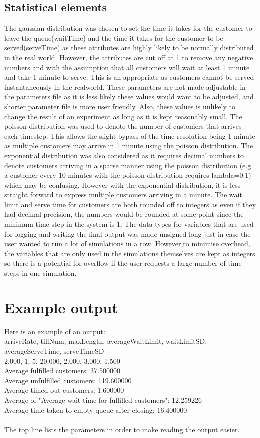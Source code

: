 \documentclass{article}
\begin{document}
\subsection{Statistical elements}
The gaussian distribution was chosen to set the time it takes for the customer to leave the queue(waitTime) and the time it takes for the customer to be served(serveTime) as these attributes are highly likely to be normally distributed in the real world. However, the attributes are cut off at 1 to remove any negative numbers and with the assumption that all customers will wait at least 1 minute and take 1 minute to serve. This is an appropriate as customers cannot be served instantaneously in the realworld. These parameters are not made adjustable in the parameters file as it is less likely these values would want to be adjusted, and shorter parameter file is more user friendly. Also, these values is unlikely to change the result of an experiment as long as it is kept reasonably small.
The poisson distribution was used to denote the number of customers that arrives each timestep. This allows the slight bypass of the time resolution being 1 minute as multiple customers may arrive in 1 minute using the poisson distribution. The exponential distribution was also considered as it requires decimal numbers to denote customers arriving in a sparse manner using the poisson distribution (e.g. a customer every 10 minutes with the poisson distribution requires lambda=0.1) which may be confusing. However with the exponential distribution, it is less straight forward to express multiple customers arriving in a minute.
The wait limit and serve time for customers are both rounded off to integers as even if they had decimal precision, the numbers would be rounded at some point since the minimum time step in the system is 1.
The data types for variables that are used for logging and writing the final output was made unsigned long just in case the user wanted to run a lot of simulations in a row. However,to minimise overhead, the variables that are only used in the simulations themselves are kept as integers so there is a potential for overflow if the user requests a large number of time steps in one simulation.

\section{Example output}
Here is an example of an output:\\
arriveRate, tillNum, maxLength, averageWaitLimit, waitLimitSD, averageServeTime, serveTimeSD \\
2.000, 1, 5, 20.000, 2.000, 3.000, 1.500\\
Average fulfilled customers: 37.500000\\
Average unfulfilled customers: 119.600000\\
Average timed out customers: 1.600000\\
Average of "Average wait time for fulfilled customers": 12.259226\\
Average time taken to empty queue after closing: 16.400000\\
\\
The top line lists the parameters in order to make reading the output easier.
\end{document}
